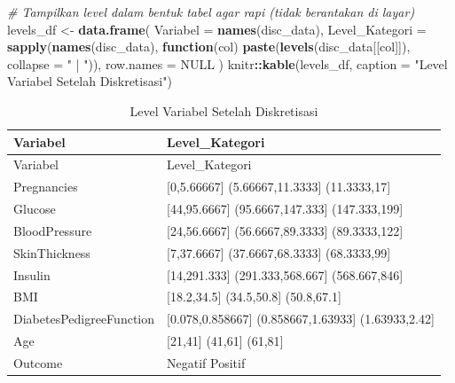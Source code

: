\documentclass[
  11pt,
]{article}
\newenvironment{Shaded}{\begin{snugshade}}{\end{snugshade}}
\newcommand{\AttributeTok}[1]{\textcolor[rgb]{0.13,0.29,0.53}{#1}}
\newcommand{\CommentTok}[1]{\textcolor[rgb]{0.56,0.35,0.01}{\textit{#1}}}
\newcommand{\ConstantTok}[1]{\textcolor[rgb]{0.56,0.35,0.01}{#1}}
\newcommand{\ControlFlowTok}[1]{\textcolor[rgb]{0.13,0.29,0.53}{\textbf{#1}}}
\newcommand{\FunctionTok}[1]{\textcolor[rgb]{0.13,0.29,0.53}{\textbf{#1}}}
\newcommand{\NormalTok}[1]{#1}
\newcommand{\OtherTok}[1]{\textcolor[rgb]{0.56,0.35,0.01}{#1}}
\newcommand{\SpecialCharTok}[1]{\textcolor[rgb]{0.81,0.36,0.00}{\textbf{#1}}}
\newcommand{\StringTok}[1]{\textcolor[rgb]{0.31,0.60,0.02}{#1}}
\begin{document}
\begin{Shaded}
\begin{Highlighting}[]
\CommentTok{\# Tampilkan level dalam bentuk tabel agar rapi (tidak berantakan di layar)}
\NormalTok{levels\_df }\OtherTok{\textless{}{-}} \FunctionTok{data.frame}\NormalTok{(}
  \AttributeTok{Variabel =} \FunctionTok{names}\NormalTok{(disc\_data),}
  \AttributeTok{Level\_Kategori =} \FunctionTok{sapply}\NormalTok{(}\FunctionTok{names}\NormalTok{(disc\_data), }\ControlFlowTok{function}\NormalTok{(col) }\FunctionTok{paste}\NormalTok{(}\FunctionTok{levels}\NormalTok{(disc\_data[[col]]), }\AttributeTok{collapse =} \StringTok{" | "}\NormalTok{)),}
  \AttributeTok{row.names =} \ConstantTok{NULL}
\NormalTok{)}
\NormalTok{knitr}\SpecialCharTok{::}\FunctionTok{kable}\NormalTok{(levels\_df, }\AttributeTok{caption =} \StringTok{"Level Variabel Setelah Diskretisasi"}\NormalTok{)}
\end{Highlighting}
\end{Shaded}

\begin{longtable}[]{@{}
  >{\raggedright\arraybackslash}p{}
  >{\raggedright\arraybackslash}p{}@{}}
\caption{Level Variabel Setelah Diskretisasi}\tabularnewline
\toprule\noalign{}
\begin{minipage}[b]{\linewidth}\raggedright
Variabel
\end{minipage} & \begin{minipage}[b]{\linewidth}\raggedright
Level\_Kategori
\end{minipage} \\
\midrule\noalign{}
\endfirsthead
\toprule\noalign{}
\begin{minipage}[b]{\linewidth}\raggedright
Variabel
\end{minipage} & \begin{minipage}[b]{\linewidth}\raggedright
Level\_Kategori
\end{minipage} \\
\midrule\noalign{}
\endhead
\bottomrule\noalign{}
\endlastfoot
Pregnancies & {[}0,5.66667{]} \textbar{} (5.66667,11.3333{]} \textbar{}
(11.3333,17{]} \\
Glucose & {[}44,95.6667{]} \textbar{} (95.6667,147.333{]} \textbar{}
(147.333,199{]} \\
BloodPressure & {[}24,56.6667{]} \textbar{} (56.6667,89.3333{]}
\textbar{} (89.3333,122{]} \\
SkinThickness & {[}7,37.6667{]} \textbar{} (37.6667,68.3333{]}
\textbar{} (68.3333,99{]} \\
Insulin & {[}14,291.333{]} \textbar{} (291.333,568.667{]} \textbar{}
(568.667,846{]} \\
BMI & {[}18.2,34.5{]} \textbar{} (34.5,50.8{]} \textbar{}
(50.8,67.1{]} \\
DiabetesPedigreeFunction & {[}0.078,0.858667{]} \textbar{}
(0.858667,1.63933{]} \textbar{} (1.63933,2.42{]} \\
Age & {[}21,41{]} \textbar{} (41,61{]} \textbar{} (61,81{]} \\
Outcome & Negatif \textbar{} Positif \\
\end{longtable}
\end{document}
